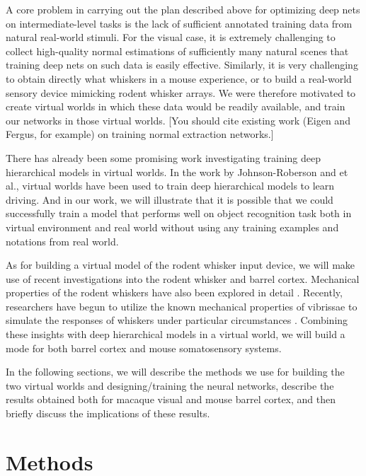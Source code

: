 \documentclass[12pt]{article}
\begin{document}
A core problem in carrying out the plan described above for optimizing deep nets on intermediate-level tasks is the lack of sufficient annotated training data from natural real-world stimuli.   For the visual case, it is extremely challenging to collect high-quality normal estimations of sufficiently many natural scenes that training deep nets on such data is easily effective.   Similarly, it is very challenging to obtain directly what whiskers in a mouse experience, or to build a real-world sensory device mimicking rodent whisker arrays.  We were therefore motivated to create virtual worlds in which these data would be readily available, and train our networks in those virtual worlds. [You should cite existing work (Eigen and Fergus, for example) on training normal extraction networks.]

There has already been some promising work investigating training deep hierarchical models in virtual worlds\cite{Qiu2016,Johnson-Roberson2016}. In the work by Johnson-Roberson and et al.\cite{Johnson-Roberson2016}, virtual worlds have been used to train deep hierarchical models to learn driving. And in our work, we will illustrate that it is possible that we could successfully train a model that performs well on object recognition task both in virtual environment and real world without using any training examples and notations from real world.

As for building a virtual model of the rodent whisker input device, we will make use of recent investigations into the rodent whisker and barrel cortex\cite{Boubenec2012,Diamond2008,Arabzadeh2005,OConnor2010}. Mechanical properties of the rodent whiskers have also been explored in detail \cite{Diamond2008,Quist2014,Towal2011}. Recently, researchers have begun to utilize the known mechanical properties of vibrissae to simulate the responses of whiskers under particular circumstances \cite{Huet2016}. Combining these insights with deep hierarchical models in a virtual world, we will build a mode for both barrel cortex and mouse somatosensory systems.

In the following sections, we will describe the methods we use for building the two virtual worlds and designing/training the neural networks, describe the results obtained both for macaque visual and mouse barrel cortex, and then briefly discuss the implications of these results.

\section*{Methods}
\end{document}
